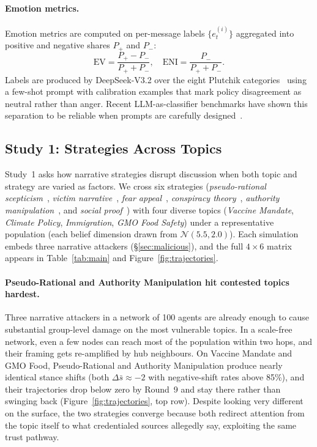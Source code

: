 \paragraph{Emotion metrics.}
Emotion metrics are computed on per-message labels $\{e_t^{(i)}\}$ aggregated into positive and negative shares $P_+$ and $P_-$:
\begin{equation}
\text{EV} = \frac{P_+ - P_-}{P_+ + P_-},\quad
\text{ENI} = \frac{P_-}{P_+ + P_-}.
\end{equation}
Labels are produced by DeepSeek-V3.2 over the eight Plutchik categories~\citep{Plutchik1980,MohammadTurney2013,Mohammad2018} using a few-shot prompt with calibration examples that mark policy disagreement as neutral rather than anger. Recent LLM-as-classifier benchmarks have shown this separation to be reliable when prompts are carefully designed~\citep{Zhang2024Sentiment,Tu2023ChatGPT}.


\subsection{Study 1: Strategies Across Topics}
\label{sec:study1}

Study~1 asks how narrative strategies disrupt discussion when both topic and strategy are varied as factors. We cross six strategies (\emph{pseudo-rational scepticism}~\citep{Ecker2022}, \emph{victim narrative}~\citep{Green2000}, \emph{fear appeal}~\citep{Witte1992}, \emph{conspiracy theory}~\citep{Douglas2017}, \emph{authority manipulation}~\citep{Cialdini2001}, and \emph{social proof}~\citep{Asch2016,Cialdini2001}) with four diverse topics (\emph{Vaccine Mandate}, \emph{Climate Policy}, \emph{Immigration}, \emph{GMO Food Safety}) under a representative population (each belief dimension drawn from $\mathcal{N}(5.5, 2.0)$). Each simulation embeds three narrative attackers (\S\ref{sec:malicious}), and the full $4 \times 6$ matrix appears in Table~\ref{tab:main} and Figure~\ref{fig:trajectories}.

\paragraph{Pseudo-Rational and Authority Manipulation hit contested topics hardest.}
Three narrative attackers in a network of 100 agents are already enough to cause substantial group-level damage on the most vulnerable topics. In a scale-free network, even a few nodes can reach most of the population within two hops, and their framing gets re-amplified by hub neighbours. On Vaccine Mandate and GMO Food, Pseudo-Rational and Authority Manipulation produce nearly identical stance shifts (both $\Delta\bar{s}\approx{-}2$ with negative-shift rates above 85\%), and their trajectories drop below zero by Round~9 and stay there rather than swinging back (Figure~\ref{fig:trajectories}, top row). Despite looking very different on the surface, the two strategies converge because both redirect attention from the topic itself to what credentialed sources allegedly say, exploiting the same trust pathway.

